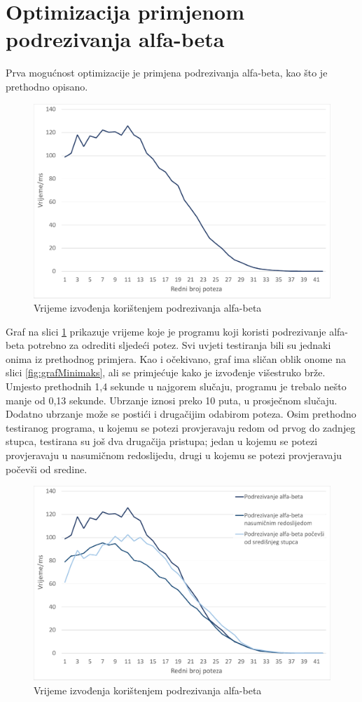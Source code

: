 \documentclass[times, utf8, seminar, numeric, tikz]{fer}
\begin{document}
\section{Optimizacija primjenom podrezivanja alfa-beta}
Prva mogućnost optimizacije je primjena podrezivanja alfa-beta, kao što je prethodno opisano. 

\begin{figure}[h]
	\centering
	\includegraphics[width=0.75\linewidth]{Graphs/alphabeta}
	\caption{Vrijeme izvođenja korištenjem podrezivanja alfa-beta}
	\label{fig:grafAlfaBeta}
\end{figure}

Graf na slici \ref{fig:grafAlfaBeta} prikazuje vrijeme koje je programu koji koristi podrezivanje alfa-beta potrebno za odrediti sljedeći potez. Svi uvjeti testiranja bili su jednaki onima iz prethodnog primjera. Kao i očekivano, graf ima sličan oblik onome na slici \ref{fig:grafMinimaks}, ali se primjećuje kako je izvođenje višestruko brže. Umjesto prethodnih 1,4 sekunde u najgorem slučaju, programu je trebalo nešto manje od 0,13 sekunde. Ubrzanje iznosi preko 10 puta, u prosječnom slučaju. Dodatno ubrzanje može se postići i drugačijim odabirom poteza. Osim prethodno testiranog programa, u kojemu se potezi provjeravaju redom od prvog do zadnjeg stupca, testirana su još dva drugačija pristupa; jedan u kojemu se potezi provjeravaju u nasumičnom redoslijedu, drugi u kojemu se potezi provjeravaju počevši od sredine. 

\begin{figure}[h]
	\centering
	\includegraphics[width=0.75\linewidth]{Graphs/podrezivanja}
	\caption{Vrijeme izvođenja korištenjem podrezivanja alfa-beta}
	\label{fig:grafPodrezivanja}
\end{figure}
\end{document}
